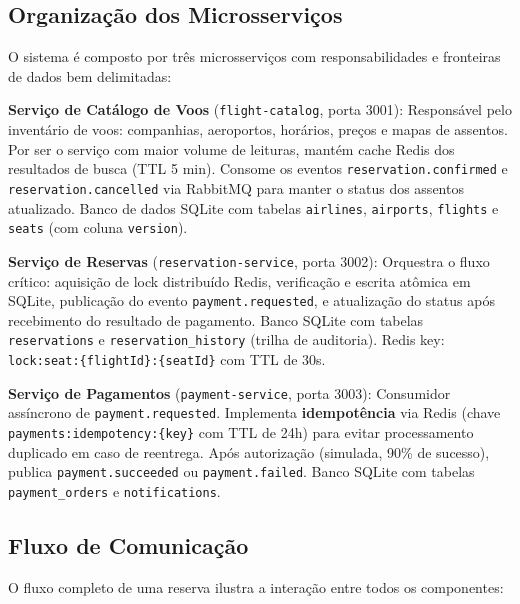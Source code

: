 \documentclass[12pt]{article}
\begin{document}
\subsection{Organização dos Microsserviços}

O sistema é composto por três microsserviços com responsabilidades e fronteiras de dados
bem delimitadas:

\textbf{Serviço de Catálogo de Voos} (\texttt{flight-catalog}, porta 3001): Responsável
pelo inventário de voos: companhias, aeroportos, horários, preços e mapas de assentos.
Por ser o serviço com maior volume de leituras, mantém cache Redis dos resultados de
busca (TTL 5 min). Consome os eventos \texttt{reservation.confirmed} e
\texttt{reservation.cancelled} via RabbitMQ para manter o status dos assentos atualizado.
Banco de dados SQLite com tabelas \texttt{airlines}, \texttt{airports}, \texttt{flights}
e \texttt{seats} (com coluna \texttt{version}).

\textbf{Serviço de Reservas} (\texttt{reservation-service}, porta 3002): Orquestra o
fluxo crítico: aquisição de lock distribuído Redis, verificação e escrita atômica em
SQLite, publicação do evento \texttt{payment.requested}, e atualização do status após
recebimento do resultado de pagamento. Banco SQLite com tabelas \texttt{reservations}
e \texttt{reservation\_history} (trilha de auditoria). Redis key:
\texttt{lock:seat:\{flightId\}:\{seatId\}} com TTL de 30s.

\textbf{Serviço de Pagamentos} (\texttt{payment-service}, porta 3003): Consumidor
assíncrono de \texttt{payment.requested}. Implementa \textbf{idempotência} via Redis
(chave \texttt{payments:idempotency:\{key\}} com TTL de 24h) para evitar processamento
duplicado em caso de reentrega. Após autorização (simulada, 90\% de sucesso), publica
\texttt{payment.succeeded} ou \texttt{payment.failed}. Banco SQLite com tabelas
\texttt{payment\_orders} e \texttt{notifications}.

\subsection{Fluxo de Comunicação}

O fluxo completo de uma reserva ilustra a interação entre todos os componentes:
\end{document}
